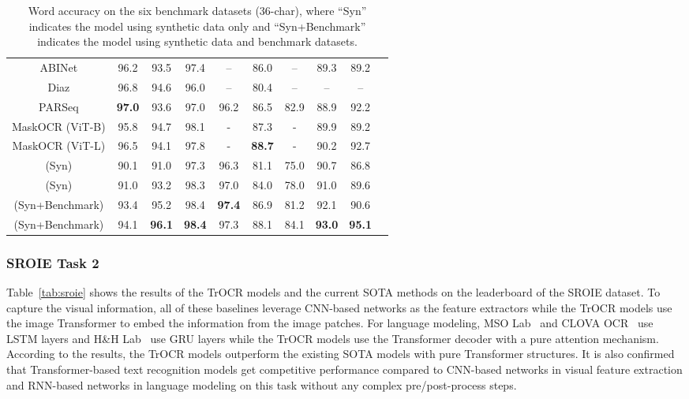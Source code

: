 \documentclass[letterpaper]{article} \usepackage{aaai23}  \usepackage{times}  \usepackage{helvet}  \usepackage{courier}  \usepackage[hyphens]{url}  \usepackage{graphicx} \urlstyle{rm} \def\UrlFont{\rm}  \usepackage{natbib}  \usepackage{caption} \frenchspacing  \setlength{\pdfpagewidth}{8.5in} \setlength{\pdfpageheight}{11in} \usepackage{algorithm}
\begin{document}
\begin{table*}[t]
{\begin{tabular*}{0.76\linewidth}{ c c c c c c c c c c }
        ABINet \cite{Fang_2021_CVPR} & 96.2 & 93.5 & 97.4 & -- & 86.0 & -- & 89.3 & 89.2 \\
        Diaz \cite{diaz2021rethinking} & 96.8 & 94.6 & 96.0 & -- & 80.4 & -- & -- & -- \\
        PARSeq \cite{bautista2022scene} & \textbf{97.0} & 93.6 & 97.0 & 96.2 & 86.5 & 82.9 & 88.9 & 92.2 \\
        MaskOCR (ViT-B) \cite{lyu2022maskocr} & 95.8 & 94.7 & 98.1 & - & 87.3 & - & 89.9 & 89.2 \\
        MaskOCR (ViT-L) \cite{lyu2022maskocr} & 96.5 & 94.1 & 97.8 & - & \textbf{88.7} & - & 90.2 & 92.7 \\
    \midrule
     (Syn) & 90.1 & 91.0 & 97.3 & 96.3 & 81.1 & 75.0 & 90.7 & 86.8  \\
         (Syn) & 91.0 & 93.2 & 98.3 & 97.0 & 84.0 & 78.0 & 91.0 & 89.6  \\
        \midrule
         (Syn+Benchmark) & 93.4 & 95.2 & 98.4 & \textbf{97.4} & 86.9 & 81.2 & 92.1 & 90.6  \\
        (Syn+Benchmark)& 94.1 & \textbf{96.1} & \textbf{98.4} & 97.3 & 88.1 & 84.1 & \textbf{93.0} & \textbf{95.1} \\
    \bottomrule
  \end{tabular*}
  }
  \caption{Word accuracy on the six benchmark datasets (36-char), where ``Syn'' indicates the model using synthetic data only and ``Syn+Benchmark'' indicates the model using synthetic data and benchmark datasets. }
  \label{tab:scene}
\end{table*}


\subsubsection{SROIE Task 2}

Table~\ref{tab:sroie} shows the results of the TrOCR models and the current SOTA methods on the leaderboard of the SROIE dataset.
To capture the visual information, all of these baselines leverage CNN-based networks as the feature extractors while the TrOCR models use the image Transformer to embed the information from the image patches. For language modeling, MSO Lab~\cite{sang2019improving} and CLOVA OCR~\cite{sang2019improving} use LSTM layers and H\&H Lab~\cite{shi2016end} use GRU layers while the TrOCR models use the Transformer decoder with a pure attention mechanism. According to the results, the TrOCR models outperform the existing SOTA models with pure Transformer structures. It is also confirmed that Transformer-based text recognition models get competitive performance compared to CNN-based networks in visual feature extraction and RNN-based networks in language modeling on this task without any complex pre/post-process steps.
\end{document}
